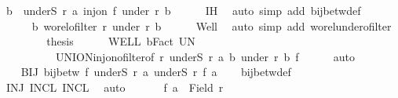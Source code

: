 \begin{isabellebody}
\ {\isachardoublequoteopen}{\isasymforall}b\ {\isasymin}\ underS\ r\ a{\isachardot}{\kern0pt}\ inj{\isacharunderscore}{\kern0pt}on\ f\ {\isacharparenleft}{\kern0pt}under\ r\ b{\isacharparenright}{\kern0pt}{\isachardoublequoteclose}\isanewline
\ \ \ \ \isamarkupfalse%
\ IH\ \isamarkupfalse%
\ {\isacharparenleft}{\kern0pt}auto\ simp\ add{\isacharcolon}{\kern0pt}\ bij{\isacharunderscore}{\kern0pt}betw{\isacharunderscore}{\kern0pt}def{\isacharparenright}{\kern0pt}\isanewline
\ \ \ \ \isamarkupfalse%
\isanewline
\ \ \ \ \isamarkupfalse%
\ {\isachardoublequoteopen}{\isasymforall}b{\isachardot}{\kern0pt}\ wo{\isacharunderscore}{\kern0pt}rel{\isachardot}{\kern0pt}ofilter\ r\ {\isacharparenleft}{\kern0pt}under\ r\ b{\isacharparenright}{\kern0pt}{\isachardoublequoteclose}\isanewline
\ \ \ \ \isamarkupfalse%
\ Well\ \isamarkupfalse%
\ {\isacharparenleft}{\kern0pt}auto\ simp\ add{\isacharcolon}{\kern0pt}\ wo{\isacharunderscore}{\kern0pt}rel{\isachardot}{\kern0pt}under{\isacharunderscore}{\kern0pt}ofilter{\isacharparenright}{\kern0pt}\isanewline
\ \ \ \ \isamarkupfalse%
\ \isamarkupfalse%
\ \ {\isacharquery}{\kern0pt}thesis\isanewline
\ \ \ \ \isamarkupfalse%
\ WELL\ bFact\ UN\isanewline
\ \ \ \ \ \ \ \ \ \ UNION{\isacharunderscore}{\kern0pt}inj{\isacharunderscore}{\kern0pt}on{\isacharunderscore}{\kern0pt}ofilter{\isacharbrackleft}{\kern0pt}of\ r\ {\isachardoublequoteopen}underS\ r\ a{\isachardoublequoteclose}\ {\isachardoublequoteopen}{\isasymlambda}b{\isachardot}{\kern0pt}\ under\ r\ b{\isachardoublequoteclose}\ f{\isacharbrackright}{\kern0pt}\isanewline
\ \ \ \ \isamarkupfalse%
\ auto\isanewline
\ \ \isamarkupfalse%
\isanewline
\ \ \isanewline
\ \ \isamarkupfalse%
\ BIJ{\isacharcolon}{\kern0pt}\ {\isachardoublequoteopen}bij{\isacharunderscore}{\kern0pt}betw\ f\ {\isacharparenleft}{\kern0pt}underS\ r\ a{\isacharparenright}{\kern0pt}\ {\isacharparenleft}{\kern0pt}underS\ r{\isacharprime}{\kern0pt}\ {\isacharparenleft}{\kern0pt}f\ a{\isacharparenright}{\kern0pt}{\isacharparenright}{\kern0pt}{\isachardoublequoteclose}\isanewline
\ \ \isamarkupfalse%
\ bij{\isacharunderscore}{\kern0pt}betw{\isacharunderscore}{\kern0pt}def\isanewline
\ \ \isamarkupfalse%
\ INJ\ INCL{}\ INCL{}\ \isamarkupfalse%
\ auto\isanewline
\ \ \isanewline
\ \ \isamarkupfalse%
\ {\isachardoublequoteopen}f\ a\ {\isasymin}\ Field\ r{\isacharprime}{\kern0pt}{\isachardoublequoteclose}\isanewline

\end{isabellebody}
